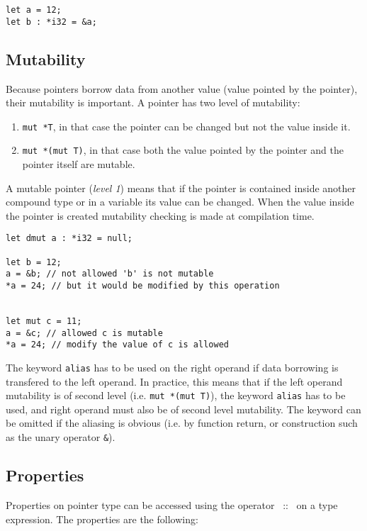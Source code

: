 \begin{lstlisting}[style=coloredverbatim]
let a = 12;
let b : *i32 = &a;
\end{lstlisting}

\subsection {Mutability}

Because pointers borrow data from another value (value pointed by the pointer),
their mutability is important. A pointer has two level of mutability:
\begin{enumerate}
\item \texttt{mut *T}, in that case the pointer can be changed but not the value
  inside it.
\item \texttt{mut *(mut T)}, in that case both the value pointed by the pointer
  and the pointer itself are mutable.
\end{enumerate}

A mutable pointer (\textit{level 1}) means that if the pointer is contained
inside another compound type or in a variable its value can be changed. When the
value inside the pointer is created mutability checking is made at compilation
time.

\begin{lstlisting}[style=coloredverbatim]
let dmut a : *i32 = null;

let b = 12;
a = &b; // not allowed 'b' is not mutable
*a = 24; // but it would be modified by this operation


let mut c = 11;
a = &c; // allowed c is mutable
*a = 24; // modify the value of c is allowed
\end{lstlisting}

The keyword \texttt{alias} has to be used on the right operand if data borrowing
is transfered to the left operand. In practice, this means that if the left
operand mutability is of second level (i.e. \texttt{mut *(mut T)}), the keyword
\texttt{alias} has to be used, and right operand must also be of second level
mutability. The keyword can be omitted if the aliasing is obvious (i.e. by
function return, or construction such as the unary operator \texttt{\&}).

\subsection {Properties}

Properties on pointer type can be accessed using the operator ~::~ on a type
expression. The properties are the following:

